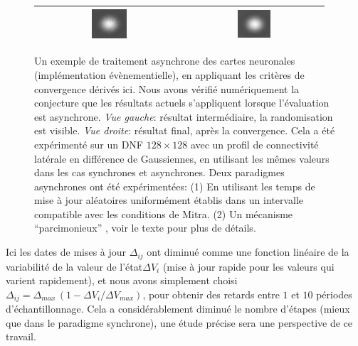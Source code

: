 \begin{figure}[htbp]
\begin{center}
\begin{tabular}{|c|c|}
\hline
\includegraphics[width=0.25\textwidth,height=0.25\textwidth]{figures/ch1_8_intermediateAsyn.jpeg} & \includegraphics[width=0.25\textwidth,height=0.25\textwidth]{figures/ch1_8_finalAsyn.jpeg}\\
\hline
\end{tabular}
\end{center}

 \caption{Un exemple de traitement asynchrone des cartes neuronales (implémentation évènementielle), en appliquant les critères de convergence dérivés ici. Nous avons vérifié numériquement la conjecture que les résultats actuels s'appliquent lorsque l'évaluation est asynchrone. {\em Vue gauche}: résultat intermédiaire, la randomisation est visible. {\em Vue droite}: résultat final, après la convergence. Cela a été expérimenté sur un DNF $ 128 \times 128 $ avec un profil de connectivité latérale en différence de Gaussiennes, en utilisant les mêmes valeurs dans les cas synchrones et asynchrones. Deux paradigmes asynchrones ont été expérimentées: (1) En utilisant les temps de mise à jour aléatoires uniformément établis dans un intervalle compatible avec les conditions de Mitra. (2) Un mécanisme ``parcimonieux'' , voir le texte pour plus de détails.}

\label{fig: bump} 
\end{figure}

Ici les dates de mises à jour $ \Delta_ {ij} $ ont diminué comme une fonction linéaire de la variabilité de la valeur de l'état ​​$ \Delta V_i$ (mise à jour rapide pour les valeurs qui varient rapidement),
et nous avons simplement choisi $ \Delta_{ij} = \Delta_{max } \, (1 - \Delta V_i / \Delta V_ {max}) $, pour obtenir des retards entre $ 1$ et $ 10 $ périodes d'échantillonnage. Cela a considérablement diminué le nombre d'étapes (mieux que dans le paradigme synchrone), une étude précise sera une perspective de ce travail.\\

